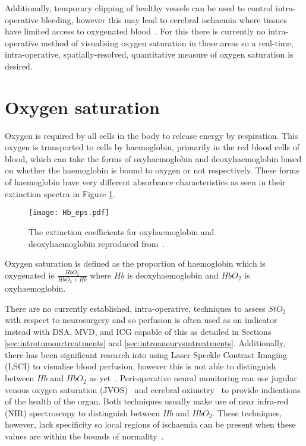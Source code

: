 Additionally, temporary clipping of healthy vessels can be used to control intra-operative bleeding, however this may lead to cerebral ischaemia where tissues have limited access to oxygenated blood~\cite{Doron2022}. For this there is currently no intra-operative method of visualising oxygen saturation in these areas so a real-time, intra-operative, spatially-resolved, quantitative measure of oxygen saturation is desired. 

\section{Oxygen saturation}
Oxygen is required by all cells in the body to release energy by respiration. This oxygen is transported to cells by haemoglobin, primarily in the red blood cells of blood, which can take the forms of oxyhaemoglobin and deoxyhaemoglobin based on whether the haemoglobin is bound to oxygen or not respectively. These forms of haemoglobin have very different absorbance characteristics as seen in their extinction spectra in Figure \ref{fig:Haemoglobinext}. 
\begin{figure}[h]
    \centering 
    \texttt{[image: Hb\_eps.pdf]}
    \caption{The extinction coefficients for oxyhaemoglobin and deoxyhaemoglobin reproduced from~\cite{Prahl1998}.}
    \label{fig:Haemoglobinext}
\end{figure}
Oxygen saturation is defined as the proportion of haemoglobin which is oxygenated ie $\frac{HbO_2}{HbO_2 + Hb}$ where $Hb$ is deoxyhaemoglobin and $HbO_2$ is oxyhaemoglobin. 

There are no currently established, intra-operative, techniques to assess $StO_2$ with respect to neurosurgery and so perfusion is often used as an indicator instead with DSA, MVD, and ICG capable of this as detailed in Sections \ref{sec:introtumourtreatments} and \ref{sec:introaneurysmtreatments}. Additionally, there has been significant research into using Laser Speckle Contrast Imaging (LSCI) to visualise blood perfusion, however this is not able to distinguish between $Hb$ and $HbO_2$ as yet~\cite{Dunn2012, Zhong2021}. Peri-operative neural monitoring can use jugular venous oxygen saturation (JVOS)~\cite{Raith2020} and cerebral oximetry~\cite{Lian2020} to provide indications of the health of the organ. Both techniques usually make use of near infra-red (NIR) spectroscopy to distinguish between $Hb$ and $HbO_2$. These techniques, however, lack specificity so local regions of ischaemia can be present when these values are within the bounds of normality~\cite{Raith2020, Zhong2021}.

